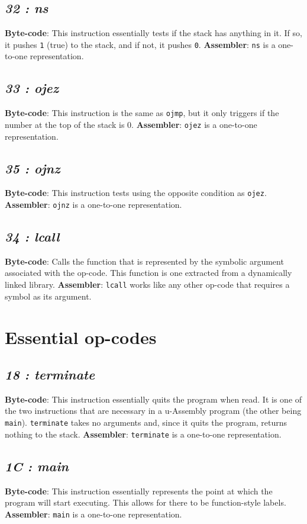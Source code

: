 \documentclass[12pt]{report}
\begin{document}
  \subsection{\emph{32 : ns}}
  \textbf{Byte-code}: This instruction essentially tests if the stack has anything
  in it.  If so, it pushes \verb|1| (true) to the stack, and if not, it pushes
  \verb|0|.\newline
  \textbf{Assembler}: \verb|ns| is a one-to-one representation.
  \subsection{\emph{33 : ojez}}
  \textbf{Byte-code}: This instruction is the same as \verb|ojmp|, but it only triggers
  if the number at the top of the stack is 0.\newline
  \textbf{Assembler}: \verb|ojez| is a one-to-one representation.
  \subsection{\emph{35 : ojnz}}
  \textbf{Byte-code}: This instruction tests using the opposite condition as
  \verb|ojez|.
  \textbf{Assembler}: \verb|ojnz| is a one-to-one representation.
  \subsection{\emph{34 : lcall}}
  \textbf{Byte-code}: Calls the function that is represented by the symbolic argument
  associated with the op-code.  This function is one extracted from a dynamically
  linked library.\newline
  \textbf{Assembler}: \verb|lcall| works like any other op-code that requires
  a symbol as its argument.

  \section{Essential op-codes}
  \subsection{\emph{18 : terminate}}
  \textbf{Byte-code}: This instruction essentially quits the program when read.  It
  is one of the two instructions that are necessary in a u-Assembly program (the
  other being \verb|main|).  \verb|terminate| takes no arguments and, since it quits
  the program, returns nothing to the stack.\newline
  \textbf{Assembler}: \verb|terminate| is a one-to-one representation.
  \subsection{\emph{1C : main}}
  \textbf{Byte-code}: This instruction essentially represents the point at which the
  program will start executing.  This allows for there to be function-style labels.
  \newline
  \textbf{Assembler}: \verb|main| is a one-to-one representation.
\end{document}
